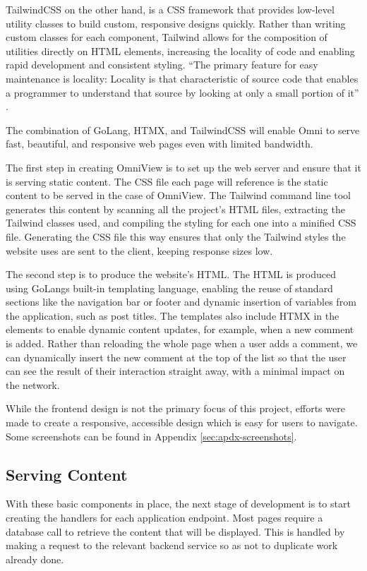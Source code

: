 TailwindCSS on the other hand, is a CSS framework that provides low-level utility classes to build custom, responsive designs quickly.
Rather than writing custom classes for each component, Tailwind allows for the composition of utilities directly on HTML elements, increasing the locality of code and enabling rapid development and consistent styling. 
``The primary feature for easy maintenance is locality: Locality is that characteristic of source code that enables a programmer to understand that source by looking at only a small portion of it'' \citep{gabriel1996patterns}.



The combination of GoLang, HTMX, and TailwindCSS will enable Omni to serve fast, beautiful, and responsive web pages even with limited bandwidth. 

The first step in creating OmniView is to set up the web server and ensure that it is serving static content.
The CSS file each page will reference is the static content to be served in the case of OmniView.
The Tailwind command line tool generates this content by scanning all the project's HTML files, extracting the Tailwind classes used, and compiling the styling for each one into a minified CSS file.
Generating the CSS file this way ensures that only the Tailwind styles the website uses are sent to the client, keeping response sizes low.

The second step is to produce the website's HTML.
The HTML is produced using GoLangs built-in templating language, enabling the reuse of standard sections like the navigation bar or footer and dynamic insertion of variables from the application, such as post titles.
The templates also include HTMX in the elements to enable dynamic content updates, for example, when a new comment is added.
Rather than reloading the whole page when a user adds a comment, we can dynamically insert the new comment at the top of the list so that the user can see the result of their interaction straight away, with a minimal impact on the network.

While the frontend design is not the primary focus of this project, efforts were made to create a responsive, accessible design which is easy for users to navigate.
Some screenshots can be found in Appendix \ref{sec:apdx-screenshots}.

\subsection{Serving Content}
With these basic components in place, the next stage of development is to start creating the handlers for each application endpoint.
Most pages require a database call to retrieve the content that will be displayed. This is handled by making a request to the relevant backend service so as not to duplicate work already done. 

